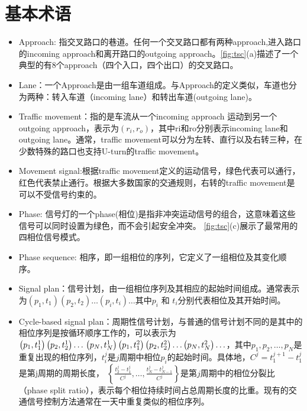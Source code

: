\section{基本术语}
\begin{itemize}
    \item Approach: 指交叉路口的巷道。任何一个交叉路口都有两种approach,进入路口的incoming approach和离开路口的outgoing approach。\autoref{fig:tsc}(a)描述了一个典型的有8个approach（四个入口，四个出口）的交叉路口。
    \item Lane：一个Approach是由一组车道组成。与Approach的定义类似，车道也分为两种：转入车道（incoming lane）和转出车道(outgoing lane)。
    \item Traffic movement：指的是车流从一个incoming approach 运动到另一个outgoing approach，表示为$\left(r_{i}, r_{o}\right)$，其中ri和ro分别表示incoming lane和outgoing lane。通常，traffic movement可以分为左转、直行以及右转三种，在少数特殊的路口也支持U-turn的traffic movement。
    \item Movement signal:根据traffic movement定义的运动信号，绿色代表可以通行，红色代表禁止通行。根据大多数国家的交通规则，右转的traffic movement是可以不受信号约束的。
    \item Phase: 信号灯的一个phase(相位)是指非冲突运动信号的组合，这意味着这些信号可以同时设置为绿色，而不会引起安全冲突。 \autoref{fig:tsc}(c)展示了最常用的四相位信号模式。
    \item Phase sequence: 相序，即一组相位的序列，它定义了一组相位及其变化顺序。
    \item Signal plan：信号计划，由一组相位序列及其相应的起始时间组成。通常表示为$\left(p_{1}, t_{1}\right)\left(p_{2}, t_{2}\right) \ldots\left(p_{i}, t_{i}\right) \ldots$其中$p_{i}$ 和 $t_{i}$分别代表相位及其开始时间。
    \item Cycle-based signal plan：周期性信号计划，与普通的信号计划不同的是其中的相位序列是按循环顺序工作的，可以表示为
    $\left(p_{1}, t_{1}^{1}\right)\left(p_{2}, t_{2}^{1}\right) \ldots \\ \left(p_{N}, t_{N}^{1}\right)\left(p_{1}, t_{1}^{2}\right)\left(p_{2}, t_{2}^{2}\right) \ldots\left(p_{N}, t_{N}^{2}\right) \ldots$，其中$p_{1}, p_{2}, \ldots, p_{N}$是重复出现的相位序列，$t_i^j$是$j$周期中相位$p_i$的起始时间。具体地，$C^{j}=t_{1}^{j+1}-t_{1}^{j}$是第j周期的周期长度， $\left\{\frac{t_{2}^j-t_{1}^j}{C^j}, \ldots, \frac{t_{N}^j-t_{N-1}^j}{C^j}\right\}$是第$j$周期中的相位分裂比（phase split ratio），表示每个相位持续时间占总周期长度的比重。现有的交通信号控制方法通常在一天中重复类似的相位序列。
\end{itemize}


